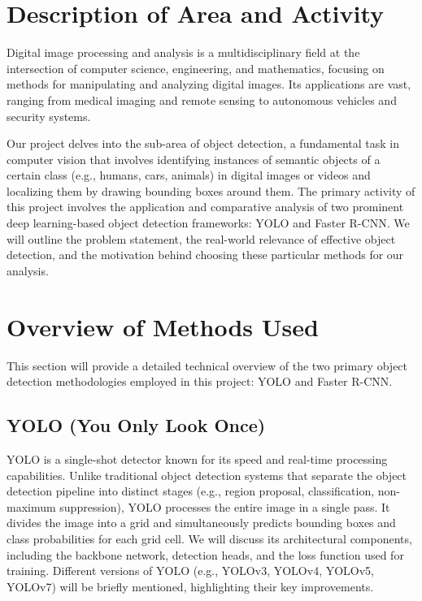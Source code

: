 \documentclass[12pt,a4paper]{article}
\begin{document}
\newpage %

\section{Description of Area and Activity}
\label{sec:intro}

Digital image processing and analysis is a multidisciplinary field at the intersection of computer science, engineering, and mathematics, focusing on methods for manipulating and analyzing digital images. Its applications are vast, ranging from medical imaging and remote sensing to autonomous vehicles and security systems.

Our project delves into the sub-area of object detection, a fundamental task in computer vision that involves identifying instances of semantic objects of a certain class (e.g., humans, cars, animals) in digital images or videos and localizing them by drawing bounding boxes around them. The primary activity of this project involves the application and comparative analysis of two prominent deep learning-based object detection frameworks: YOLO and Faster R-CNN. We will outline the problem statement, the real-world relevance of effective object detection, and the motivation behind choosing these particular methods for our analysis.

\section{Overview of Methods Used}
\label{sec:methods}

This section will provide a detailed technical overview of the two primary object detection methodologies employed in this project: YOLO and Faster R-CNN.

\subsection{YOLO (You Only Look Once)}
\label{ssec:yolo}
YOLO is a single-shot detector known for its speed and real-time processing capabilities. Unlike traditional object detection systems that separate the object detection pipeline into distinct stages (e.g., region proposal, classification, non-maximum suppression), YOLO processes the entire image in a single pass. It divides the image into a grid and simultaneously predicts bounding boxes and class probabilities for each grid cell. We will discuss its architectural components, including the backbone network, detection heads, and the loss function used for training. Different versions of YOLO (e.g., YOLOv3, YOLOv4, YOLOv5, YOLOv7) will be briefly mentioned, highlighting their key improvements.
\end{document}
